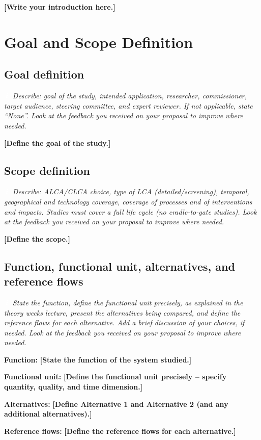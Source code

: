 \documentclass[10pt]{article}
\newcommand{\placeholder}[1]{\textcolor{lcaph}{\textbf{#1}}}    %
\newcommand{\infoicon}{{\setlength{\fboxsep}{1pt}\colorbox{lcablue}{\textcolor{white}{\upshape\bfseries\,i\,}}}}
\newcommand{\guidance}[1]{\par\noindent\colorbox{lcabox}{\parbox{\dimexpr\linewidth-2\fboxsep}{\setlength{\parskip}{2pt}\small\itshape\infoicon\ \color{lcatext}#1}}\par}
\begin{document}
\placeholder{[Write your introduction here.]}

\section{Goal and Scope Definition}
\subsection{Goal definition}
\guidance{Describe: goal of the study, intended application, researcher, commissioner, target audience, steering committee, and expert reviewer. If not applicable, state ``None''. Look at the feedback you received on your proposal to improve where needed.}

\placeholder{[Define the goal of the study.]}

\subsection{Scope definition}
\guidance{Describe: ALCA/CLCA choice, type of LCA (detailed/screening), temporal, geographical and technology coverage, coverage of processes and of interventions and impacts. Studies must cover a full life cycle (no cradle-to-gate studies). Look at the feedback you received on your proposal to improve where needed.}

\placeholder{[Define the scope.]}

\subsection{Function, functional unit, alternatives, and reference flows}
\guidance{State the function, define the functional unit precisely, as explained in the theory weeks lecture, present the alternatives being compared, and define the reference flows for each alternative. Add a brief discussion of your choices, if needed. Look at the feedback you received on your proposal to improve where needed.}

\textbf{Function:} \placeholder{[State the function of the system studied.]}

\textbf{Functional unit:} \placeholder{[Define the functional unit precisely -- specify quantity, quality, and time dimension.]}

\textbf{Alternatives:} \placeholder{[Define Alternative 1 and Alternative 2 (and any additional alternatives).]}

\textbf{Reference flows:} \placeholder{[Define the reference flows for each alternative.]}
\end{document}
